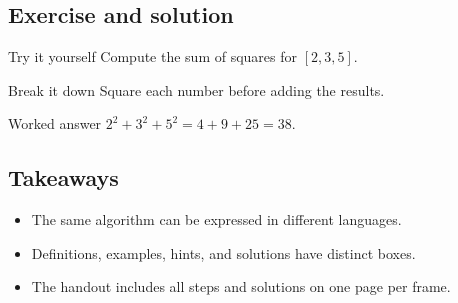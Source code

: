 \documentclass[\BayMode]{baybeamer}
\begin{document}
\subsection{Exercise and solution}
\begin{frame}
  \begin{examplebox}{Try it yourself}
    Compute the sum of squares for $[2,3,5]$.
  \end{examplebox}
  \begin{hintbox}{Break it down}
    Square each number before adding the results.
  \end{hintbox}
  \pause
  \begin{solutionbox}{Worked answer}
    $2^2+3^2+5^2=4+9+25=38$.
  \end{solutionbox}
\end{frame}

\subsection{Takeaways}
\begin{frame}
  \begin{itemize}
    \item The same algorithm can be expressed in different languages.
    \item Definitions, examples, hints, and solutions have distinct boxes.
    \item The handout includes all steps and solutions on one page per frame.
  \end{itemize}
\end{frame}
\end{document}
